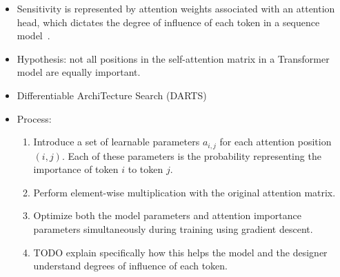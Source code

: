 \begin{itemize}
\begin{itemize}
        \item Sensitivity is represented by attention weights associated with an attention head, which dictates the degree of influence of each token in a sequence model~\cite{shi2021sparsebert}.
        \item Hypothesis: not all positions in the self-attention matrix in a Transformer model are equally important.
        \item Differentiable ArchiTecture Search (DARTS)
        \item Process:
        \begin{enumerate}
            \item Introduce a set of learnable parameters $a_{i,j}$ for each attention position $(i, j)$.
            Each of these parameters is the probability representing the importance of token $i$ to token $j$.
            \item Perform element-wise multiplication with the original attention matrix.
            \item Optimize both the model parameters and attention importance parameters simultaneously during training using gradient descent.
            \item TODO explain specifically how this helps the model and the designer understand degrees of influence of each token.
        \end{enumerate}
    \end{itemize}
\end{itemize}